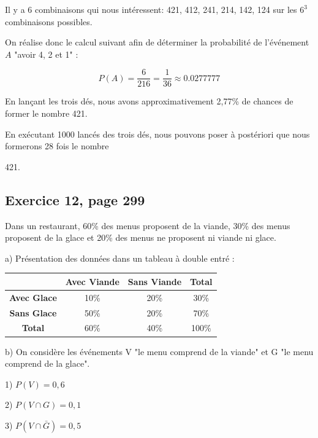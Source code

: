 \documentclass[10pt]{article}
\begin{document}
Il y a 6 combinaisons qui nous intéressent: 421, 412, 241, 214, 142, 124 sur les $6^3$ combinaisons possibles.

On réalise donc le calcul suivant afin de déterminer la probabilité de l'événement $A$ "avoir 4, 2 et 1" :

$$P(A)=\frac{6}{216}=\frac{1}{36}\approx 0.0277777$$\vspace{1pt}

En lançant les trois dés, nous avons approximativement 2,77\% de chances de former le nombre 421.

En exécutant 1000 lancés des trois dés, nous pouvons poser à postériori que nous formerons 28 fois le nombre 

421.
\newpage

\subsection*{Exercice 12, page 299}
Dans un restaurant, 60\% des menus proposent de la viande, 30\% des menus proposent de la glace et 20\% des menus ne proposent ni viande ni glace.\vspace{6pt}

a) Présentation des données dans un tableau à double entré :

\begin{center}
\begin{tabular}{ |c|c|c|c| } 
 \hline
 & \textbf{Avec Viande} & \textbf{Sans Viande} & \textbf{Total} \\ 
 \hline
 \textbf{Avec Glace} & 10\% & 20\% & 30\%\\ 
 \hline
 \textbf{Sans Glace} & 50\% & 20\% & 70\%\\ 
 \hline
 \textbf{Total} & 60\% & 40\% & 100\%\\
 \hline
\end{tabular}
\end{center}

b) On considère les événements V "le menu comprend de la viande" et G "le menu comprend de la glace".\vspace{6pt}

\hspace{10pt}1) $P(V)=0,6$\vspace{4pt}

\hspace{10pt}2) $P(V\cap G)=0,1$\vspace{4pt}

\hspace{10pt}3) $P(V\cap \bar{G})=0,5$\vspace{4pt}
\end{document}
